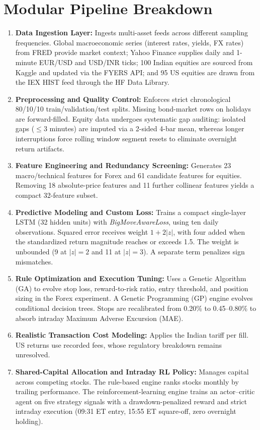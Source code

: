 \documentclass[12pt,a4paper,twoside,openany]{report}
\begin{document}
\clearpage

\section*{Modular Pipeline Breakdown}
\begin{enumerate}[leftmargin=1.2cm, itemsep=3pt]
  \item \textbf{Data Ingestion Layer:} Ingests multi-asset feeds across different sampling frequencies. Global macroeconomic series (interest rates, yields, FX rates) from FRED provide market context; Yahoo Finance supplies daily and 1-minute EUR/USD and USD/INR ticks; 100 Indian equities are sourced from Kaggle and updated via the FYERS API; and 95 US equities are drawn from the IEX HIST feed through the HF Data Library.
  \item \textbf{Preprocessing and Quality Control:} Enforces strict chronological 80/10/10 train/validation/test splits. Missing bond-market rows on holidays are forward-filled. Equity data undergoes systematic gap auditing: isolated gaps ($\le 3$ minutes) are imputed via a 2-sided 4-bar mean, whereas longer interruptions force rolling window segment resets to eliminate overnight return artifacts.
  \item \textbf{Feature Engineering and Redundancy Screening:} Generates 23 macro/technical features for Forex and 61 candidate features for equities. Removing 18 absolute-price features and 11 further collinear features yields a compact 32-feature subset.
  \item \textbf{Predictive Modeling and Custom Loss:} Trains a compact single-layer LSTM (32 hidden units) with \textit{BigMoveAwareLoss}, using ten daily observations. Squared error receives weight $1+2|z|$, with four added when the standardized return magnitude reaches or exceeds 1.5. The weight is unbounded (9 at $|z|=2$ and 11 at $|z|=3$). A separate term penalizes sign mismatches.
  \item \textbf{Rule Optimization and Execution Tuning:} Uses a Genetic Algorithm (GA) to evolve stop loss, reward-to-risk ratio, entry threshold, and position sizing in the Forex experiment. A Genetic Programming (GP) engine evolves conditional decision trees. Stops are recalibrated from 0.20\% to 0.45--0.80\% to absorb intraday Maximum Adverse Excursion (MAE).
  \item \textbf{Realistic Transaction Cost Modeling:} Applies the Indian tariff per fill. US returns use recorded fees, whose regulatory breakdown remains unresolved.
  \item \textbf{Shared-Capital Allocation and Intraday RL Policy:} Manages capital across competing stocks. The rule-based engine ranks stocks monthly by trailing performance. The reinforcement-learning engine trains an actor--critic agent on five strategy signals with a drawdown-penalized reward and strict intraday execution (09:31 ET entry, 15:55 ET square-off, zero overnight holding).
\end{enumerate}
\end{document}
